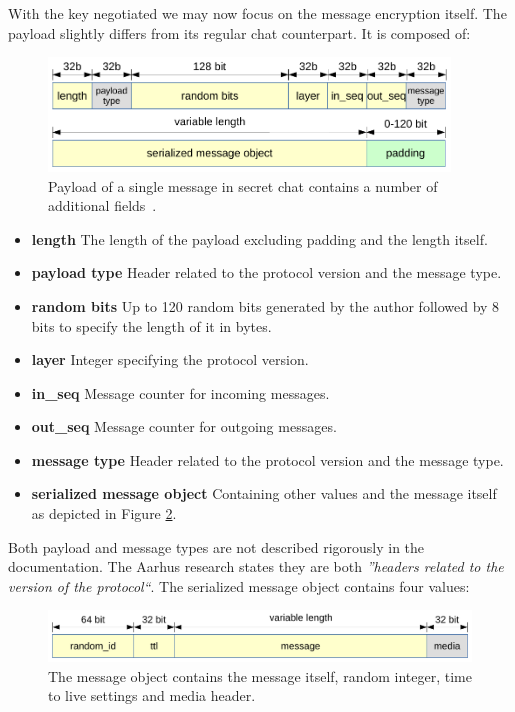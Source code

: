 \documentclass[thesis=M,english]{FITthesis}[2012/10/20]
\begin{document}
With the key negotiated we may now focus on the message encryption itself. The payload slightly differs from its regular chat counterpart. It is composed of:

\begin{figure}[htb]
	\centering
	\includegraphics[width=0.95\textwidth]{secret-payload.pdf}
	\caption[Message payload in secret chats]{Payload of a single message in secret chat contains a number of additional fields~\cite{telegram-aarhus}.}
	\label{img:crypto-secret-payload}
\end{figure}

\begin{itemize}
	\item  \textbf{length} The length of the payload excluding padding and the length itself.
	\item  \textbf{payload type} Header related to the protocol version and the message type.
	\item  \textbf{random bits} Up to 120 random bits generated by the author followed by 8 bits to specify the length of it in bytes.
	\item  \textbf{layer} Integer specifying the protocol version.
	\item  \textbf{in\_seq} Message counter for incoming messages.
	\item  \textbf{out\_seq} Message counter for outgoing messages.
	\item  \textbf{message type} Header related to the protocol version and the message type.
	\item  \textbf{serialized message object} Containing other values and the message itself as depicted in Figure \ref{img:crypto-secret-messageobject}.
\end{itemize}

Both payload and message types are not described rigorously in the documentation. The Aarhus research \cite{telegram-aarhus} states they are both \emph{''headers related to the version of the protocol``}. The serialized message object contains four values:

\begin{figure}[htb]
	\centering
	\includegraphics[width=1\textwidth]{decrypted-message.pdf}
	\caption[Message object]{The message object contains the message itself, random integer, time to live settings and media header.}
	\label{img:crypto-secret-messageobject}
\end{figure}
\end{document}
